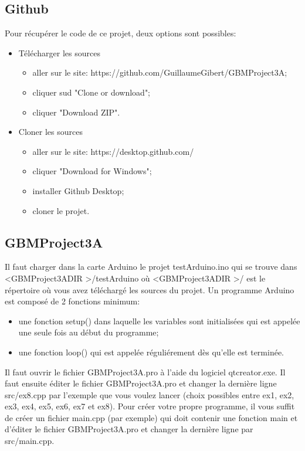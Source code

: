 \documentclass{article}
\begin{document}
	\subsection{Github}
Pour récupérer le code de ce projet, deux options sont possibles:
\begin{itemize}
	\item Télécharger les sources
		\begin{itemize}
			\item aller sur le site: https://github.com/GuillaumeGibert/GBMProject3A;
			\item cliquer sud "Clone or download";
			\item cliquer "Download ZIP".
		\end{itemize}
	\item Cloner les sources
		\begin{itemize}
	 		\item aller sur le site: https://desktop.github.com/
			\item cliquer "Download for Windows";
			\item  installer Github Desktop;
			\item cloner le projet.
		\end{itemize}
\end{itemize}

	\subsection{GBMProject3A}
Il faut charger dans la carte Arduino le projet testArduino.ino qui se trouve dans \textless GBMProject3ADIR \textgreater/testArduino où \textless GBMProject3ADIR \textgreater/ est le répertoire où vous avez téléchargé les sources du projet.
Un programme Arduino est composé de 2 fonctions minimum:
\begin{itemize}
	\item une fonction setup() dans laquelle les variables sont initialisées qui est appelée une seule fois au début du programme;
	\item une fonction loop() qui est appelée réguliérement dès qu'elle est terminée.
\end{itemize}


Il faut ouvrir le fichier GBMProject3A.pro à l'aide du logiciel qtcreator.exe. 
Il faut ensuite éditer le fichier GBMProject3A.pro et changer la dernière ligne src/ex8.cpp par l'exemple que vous voulez lancer (choix possibles entre ex1, ex2, ex3, ex4, ex5, ex6, ex7 et ex8).
Pour créer votre propre programme, il vous suffit de créer un fichier main.cpp (par exemple) qui doit contenir une fonction main et d'éditer le fichier GBMProject3A.pro et changer la dernière ligne par src/main.cpp. 
\end{document}
